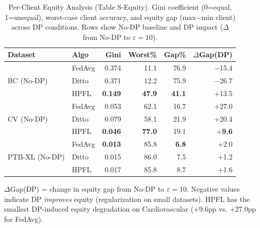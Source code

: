 \documentclass[conference,a4paper]{IEEEtran}
\begin{document}
\begin{table}[!ht]
\centering
\caption{Per-Client Equity Analysis (Table S-Equity). Gini coefficient (0=equal, 1=unequal), worst-case client accuracy, and equity gap (max$-$min client) across DP conditions. Rows show No-DP baseline and DP impact ($\Delta$ from No-DP to $\varepsilon{=}10$).}
\label{tab:s_equity}
\scriptsize
\begin{tabular}{llrrrr}
\toprule
\textbf{Dataset} & \textbf{Algo} & \textbf{Gini} & \textbf{Worst\%} & \textbf{Gap\%} & \textbf{$\Delta$Gap(DP)} \\
\midrule
\multirow{3}{*}{BC (No-DP)} & FedAvg & 0.374 & 11.1 & 76.9 & $-$15.4 \\
 & Ditto & 0.371 & 12.2 & 75.9 & $-$26.7 \\
 & HPFL & \textbf{0.149} & \textbf{47.9} & \textbf{41.1} & $+$13.5 \\
\midrule
\multirow{3}{*}{CV (No-DP)} & FedAvg & 0.053 & 62.1 & 16.7 & $+$27.0 \\
 & Ditto & 0.079 & 58.1 & 21.9 & $+$20.4 \\
 & HPFL & \textbf{0.046} & \textbf{77.0} & 19.1 & \textbf{$+$9.6} \\
\midrule
\multirow{3}{*}{PTB-XL (No-DP)} & FedAvg & \textbf{0.013} & 85.8 & \textbf{6.8} & $+$2.0 \\
 & Ditto & 0.015 & 86.0 & 7.5 & $+$1.2 \\
 & HPFL & 0.017 & 85.8 & 8.7 & $+$1.6 \\
\bottomrule
\end{tabular}

\vspace{1mm}
\footnotesize{$\Delta$Gap(DP) = change in equity gap from No-DP to $\varepsilon{=}10$. Negative values indicate DP \textit{improves} equity (regularization on small datasets). HPFL has the smallest DP-induced equity degradation on Cardiovascular ($+$9.6pp vs. $+$27.0pp for FedAvg).}
\end{table}
\end{document}
